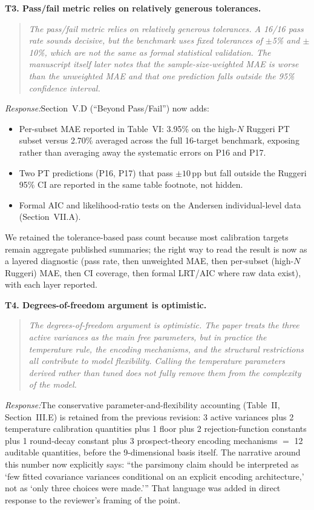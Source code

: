 \documentclass[11pt]{article}
\newcommand{\rev}[1]{\textbf{#1}}
\newcommand{\resp}{\medskip\noindent\emph{Response:}\quad}
\begin{document}
\rev{T3. Pass/fail metric relies on relatively generous tolerances.}
\begin{quote}\itshape\small
The pass/fail metric relies on relatively generous tolerances. A 16/16 pass rate sounds decisive, but the benchmark uses fixed tolerances of $\pm$5\% and $\pm$10\%, which are not the same as formal statistical validation. The manuscript itself later notes that the sample-size-weighted MAE is worse than the unweighted MAE and that one prediction falls outside the 95\% confidence interval.
\end{quote}
\resp Section~V.D (``Beyond Pass/Fail'') now adds:
\begin{itemize}[leftmargin=*]
  \item Per-subset MAE reported in Table~VI: 3.95\% on the high-$N$ Ruggeri PT subset
        versus 2.70\% averaged across the full 16-target benchmark, exposing rather
        than averaging away the systematic errors on P16 and P17.
  \item Two PT predictions (P16, P17) that pass $\pm10$\,pp but fall outside the Ruggeri
        95\% CI are reported in the same table footnote, not hidden.
  \item Formal AIC and likelihood-ratio tests on the Andersen individual-level data
        (Section~VII.A).
\end{itemize}
We retained the tolerance-based pass count because most calibration targets remain
aggregate published summaries; the right way to read the result is now as a layered
diagnostic (pass rate, then unweighted MAE, then per-subset (high-$N$ Ruggeri) MAE, then CI coverage, then
formal LRT/AIC where raw data exist), with each layer reported.

\rev{T4. Degrees-of-freedom argument is optimistic.}
\begin{quote}\itshape\small
The degrees-of-freedom argument is optimistic. The paper treats the three active variances as the main free parameters, but in practice the temperature rule, the encoding mechanisms, and the structural restrictions all contribute to model flexibility. Calling the temperature parameters derived rather than tuned does not fully remove them from the complexity of the model.
\end{quote}
\resp The conservative parameter-and-flexibility accounting (Table~II, Section~III.E) is
retained from the previous revision: 3 active variances plus 2 temperature calibration
quantities plus 1 floor plus 2 rejection-function constants plus 1 round-decay constant
plus 3 prospect-theory encoding mechanisms $=$ 12 auditable quantities, before the
9-dimensional basis itself. The narrative around this number now explicitly says: ``the
parsimony claim should be interpreted as `few fitted covariance variances conditional on
an explicit encoding architecture,' not as `only three choices were made.''' That language
was added in direct response to the reviewer's framing of the point.
\end{document}
